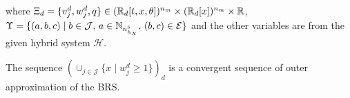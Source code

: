   \normalsize
  where $\Xi_d=\{v^d_j,w^d_j,q\}\in (\mathbb{R}_d[t,x,\theta])^{n_m}\times (\mathbb{R}_d[x])^{n_m}\times\mathbb{R}$, \mbox{$\Upsilon=\{(a,b,c)\mid b\in \mathcal J,\,a\in \mathbb{N}_{n^b_{h_X}},\,(b,c)\in \mathcal E\}$} and the other variables are from the given hybrid system $\mathcal H$.
  \begin{lemma}
    The sequence $(\cup_{j\in \mathcal J}\{x\mid w_j^d\ge 1\})_d$ is a convergent sequence of outer approximation of the BRS.
  \end{lemma}
